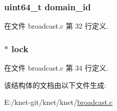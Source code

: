 \subsubsection[{domain\+\_\+id}]{\setlength{\rightskip}{0pt plus 5cm}uint64\+\_\+t domain\+\_\+id}\label{struct__broadcast__t_a2243d1c6a9d72aeb7c6d6e5331d5d64f}


在文件 broadcast.\+c 第 32 行定义.

\hypertarget{struct__broadcast__t_abf14bc3bc3eb5e72e92811fcc36b5063}{}
\subsubsection[{lock}]{$\ast$ lock}\label{struct__broadcast__t_abf14bc3bc3eb5e72e92811fcc36b5063}


在文件 broadcast.\+c 第 34 行定义.



该结构体的文档由以下文件生成\+:\begin{DoxyCompactItemize}
\item 
E\+:/knet-\/git/knet/knet/\hyperlink{knet_2broadcast_8c}{broadcast.\+c}\end{DoxyCompactItemize}
